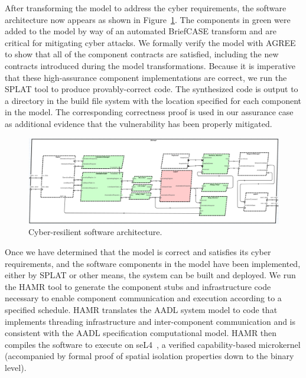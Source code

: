 
After transforming the model to address the cyber requirements, the software architecture now appears as shown in Figure~\ref{fig:hardened-sw}.  The components in green were added to the model by way of an automated BriefCASE transform and are critical for mitigating cyber attacks. 
We formally verify the model with AGREE to show that all of the component contracts are satisfied, including the new contracts introduced during the model transformations.
Because it is imperative that these high-assurance component implementations are correct,
we run the SPLAT tool to produce provably-correct code.  
The synthesized code is output to a directory in the build file system with the location specified for each component in the model.  The corresponding correctness proof is used in our assurance case as additional evidence that the vulnerability has been properly mitigated.

\begin{figure}[h]
	\centering
	\includegraphics[width=1\columnwidth]{figs/hardened-sw.png}
	\caption{Cyber-resilient software architecture.} 
	\label{fig:hardened-sw} 
\end{figure}

Once we have determined that the model is correct and satisfies its cyber requirements, and the software components in the model have been implemented, either by SPLAT or other means, the system can be built and deployed.  We run the HAMR tool to generate the component stubs and infrastructure code necessary to enable component communication and execution according to a specified schedule.
HAMR translates the AADL system model to code that implements threading infrastructure and inter-component communication and is consistent with the AADL specification computational model.
%
HAMR then compiles the software to execute on seL4~\cite{DBLP:journals/cacm/KleinAEHCDEEKNSTW10}, a
verified capability-based microkernel (accompanied by formal proof of
spatial isolation properties down to the binary level).

